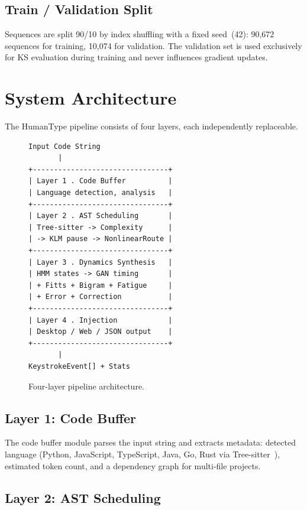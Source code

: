 \documentclass[sigconf,nonacm]{acmart}
\begin{document}
\subsection{Train / Validation Split}

Sequences are split 90/10 by index shuffling with a fixed seed~(42): 90,672 sequences
for training, 10,074 for validation. The validation set is used exclusively for KS
evaluation during training and never influences gradient updates.

\section{System Architecture}

The HumanType pipeline consists of four layers, each independently replaceable.

\begin{figure}[t]
\centering
\begin{verbatim}
Input Code String
       |
+--------------------------------+
| Layer 1 . Code Buffer          |
| Language detection, analysis   |
+--------------------------------+
| Layer 2 . AST Scheduling       |
| Tree-sitter -> Complexity      |
| -> KLM pause -> NonlinearRoute |
+--------------------------------+
| Layer 3 . Dynamics Synthesis   |
| HMM states -> GAN timing       |
| + Fitts + Bigram + Fatigue     |
| + Error + Correction           |
+--------------------------------+
| Layer 4 . Injection            |
| Desktop / Web / JSON output    |
+--------------------------------+
       |
KeystrokeEvent[] + Stats
\end{verbatim}
\caption{Four-layer pipeline architecture.}
\label{fig:pipeline}
\end{figure}

\subsection{Layer 1: Code Buffer}

The code buffer module parses the input string and extracts metadata: detected language
(Python, JavaScript, TypeScript, Java, Go, Rust via Tree-sitter~\cite{treesitter}),
estimated token count, and a dependency graph for multi-file projects.

\subsection{Layer 2: AST Scheduling}
\end{document}
